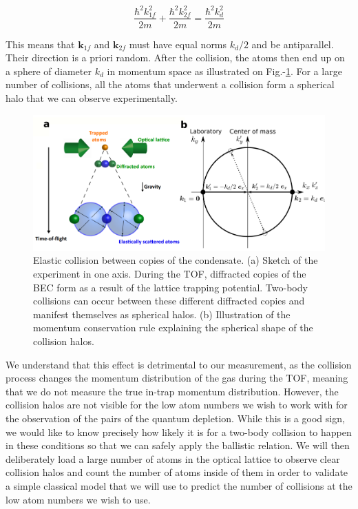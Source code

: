 \begin{equation}
    \frac{\hbar^2 k^2_{1f}}{2m} + \frac{\hbar^2 k^2_{2f}}{2m} =  \frac{\hbar^2 k_d^2}{2m}
\end{equation}

\noindent This means that $\bm{k}_{1f}$ and $\bm{k}_{2f}$ must have equal norms $k_d/2$ and be antiparallel. Their direction is a priori random. After the collision, the atoms then end up on a sphere of diameter $k_d$ in momentum space as illustrated on Fig.-\ref{fig:schema_collisions}. For a large number of collisions, all the atoms that underwent a collision form a spherical halo that we can observe experimentally.

\begin{figure}[ht!]
    \centering
    \includegraphics[width=\textwidth]{Fig/Chapter3/schema_collisions.png}
    \caption{Elastic collision between copies of the condensate. (a) Sketch of the experiment in one axis. During the TOF, diffracted copies of the BEC form as a result of the lattice trapping potential. Two-body collisions can occur between these different diffracted copies and manifest themselves as spherical halos. (b) Illustration of the momentum conservation rule explaining the spherical shape of the collision halos.}
    \label{fig:schema_collisions}
\end{figure}

We understand that this effect is detrimental to our measurement, as the collision process changes the momentum distribution of the gas during the TOF, meaning that we do not measure the true in-trap momentum distribution. However, the collision halos are not visible for the low atom numbers we wish to work with for the observation of the \kmk pairs of the quantum depletion. While this is a good sign, we would like to know precisely how likely it is for a two-body collision to happen in these conditions so that we can safely apply the ballistic relation. We will then deliberately load a large number of atoms in the optical lattice to observe clear collision halos and count the number of atoms inside of them in order to validate a simple classical model that we will use to predict the number of collisions at the low atom numbers we wish to use.

